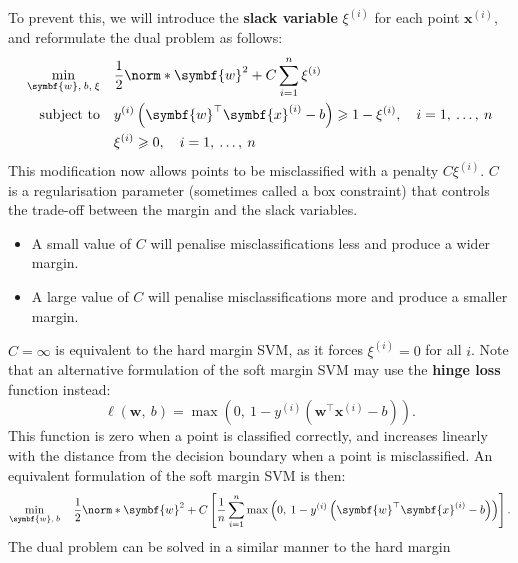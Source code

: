 \documentclass{article}
\begin{document}
To prevent this, we will introduce the \textbf{slack variable}
\(\xi^{\left( i \right)}\) for each point \(\symbf{x}^{\left( i
\right)}\), and reformulate the dual problem as follows:
\begin{align*}
    \min_{\symbf{w},\: b,\: \xi} \quad & \frac{1}{2}\norm*{\symbf{w}}^2 + C \sum_{i = 1}^n \xi^{\left( i \right)}                                                                            \\
    \text{subject to} \quad            & y^{\left( i \right)} \left( \symbf{w}^\top \symbf{x}^{\left( i \right)} - b \right) \geqslant 1 - \xi^{\left( i \right)}, \quad i = 1,\: \dots,\: n \\
                                       & \xi^{\left( i \right)} \geqslant 0, \quad i = 1,\: \dots,\: n
\end{align*}
This modification now allows points to be misclassified with a penalty
\(C \xi^{\left( i \right)}\). \(C\) is a regularisation parameter
(sometimes called a box constraint) that controls the trade-off
between the margin and the slack variables.
\begin{itemize}
    \item A small value of \(C\) will penalise misclassifications less
          and produce a wider margin.
    \item A large value of \(C\) will penalise misclassifications more
          and produce a smaller margin.
\end{itemize}
\(C = \infty\) is equivalent to the hard margin SVM, as it forces
\(\xi^{\left( i \right)} = 0\) for all \(i\). Note that an alternative
formulation of the soft margin SVM may use the \textbf{hinge loss}
function instead:
\begin{equation*}
    \ell\left( \symbf{w},\: b \right) = \max\left( 0,\: 1 - y^{\left( i \right)} \left( \symbf{w}^\top \symbf{x}^{\left( i \right)} - b \right) \right).
\end{equation*}
This function is zero when a point is classified correctly, and
increases linearly with the distance from the decision boundary when
a point is misclassified. An equivalent formulation of the soft margin
SVM is then:
\begin{equation*}
    \min_{\symbf{w},\: b} \quad \frac{1}{2}\norm*{\symbf{w}}^2 + C \left[ \frac{1}{n} \sum_{i = 1}^n \max\left( 0,\: 1 - y^{\left( i \right)} \left( \symbf{w}^\top \symbf{x}^{\left( i \right)} - b \right) \right) \right].
\end{equation*}
The dual problem can be solved in a similar manner to the hard margin
\end{document}
